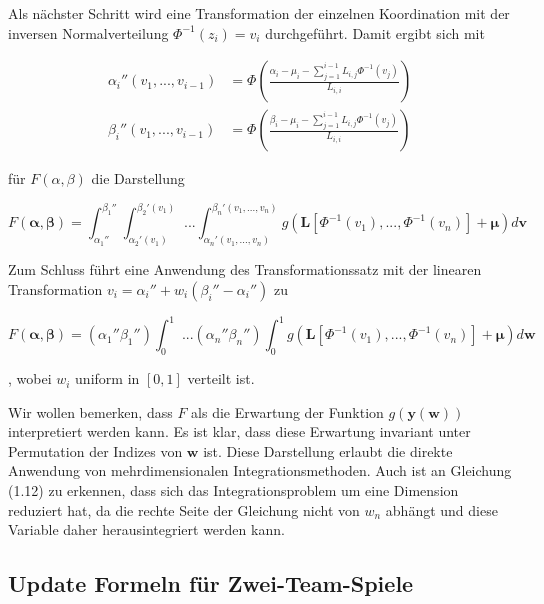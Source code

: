\documentclass[12pt,a4paper]{scrartcl}
\numberwithin{equation}{section}
\begin{document}
Als nächster Schritt wird eine Transformation der einzelnen Koordination mit der inversen Normalverteilung $\Phi^{-1}(z_i) = v_i$ durchgeführt. Damit ergibt sich mit

\begin{equation}
\begin{split}
 \alpha_i''(v_1,...,v_{i-1})&=  \Phi (\frac{\alpha_i - \mu_i - \sum_{j=1}^{i-1} L_{i,j}\Phi^{-1}(v_j)}{L_{i,i}} )\\
 \beta_i''(v_1,...,v_{i-1})&=  \Phi(\frac{\beta_i - \mu_i - \sum_{j=1}^{i-1} L_{i,j}\Phi^{-1}(v_j)}{L_{i,i}} )
 \end{split}
\end{equation}

für $F(\alpha,\beta)$ die Darstellung

\begin{equation}
  F(\mathbf{\alpha},\mathbf{\beta}) = \int_{\alpha_1''}^{\beta_1''} \int_{\alpha_2'(v_1)}^{\beta_2'(v_1)} \text{ ...} \int_{\alpha_n'(v_1,...,v_n)}^{\beta_n'(v_1,...,v_n)} g(\mathbf{L}[\Phi^{-1}(v_1),...,\Phi^{-1}(v_n)] + \mathbf{\mu}) d\mathbf{v}
\end{equation}

Zum Schluss führt eine Anwendung des Transformationssatz mit der linearen Transformation $v_i = \alpha_i'' + w_i(\beta_i''-\alpha_i'')$ zu

\begin{equation}
  F(\mathbf{\alpha},\mathbf{\beta}) = (\alpha_1'' \beta_1'') \int_{0}^{1} \text{ ...}(\alpha_n'' \beta_n'') \int_{0}^{1} g(\mathbf{L}[\Phi^{-1}(v_1),...,\Phi^{-1}(v_n)] + \mathbf{\mu}) d\mathbf{w}
\end{equation}

, wobei $w_i$ uniform in $[0,1]$ verteilt ist.

Wir wollen bemerken, dass $F$ als die Erwartung der Funktion $g(\mathbf{y(w)})$ interpretiert werden kann. Es ist klar, dass diese Erwartung invariant unter Permutation der Indizes
von $\mathbf{w}$ ist. Diese Darstellung erlaubt die direkte Anwendung von mehrdimensionalen Integrationsmethoden.
Auch ist an Gleichung (1.12) zu erkennen, dass sich das Integrationsproblem um eine Dimension
reduziert hat, da die rechte Seite der Gleichung nicht von $w_n$ abhängt und diese Variable daher
herausintegriert werden kann.
 

\subsection{Update Formeln für Zwei-Team-Spiele}
\end{document}
